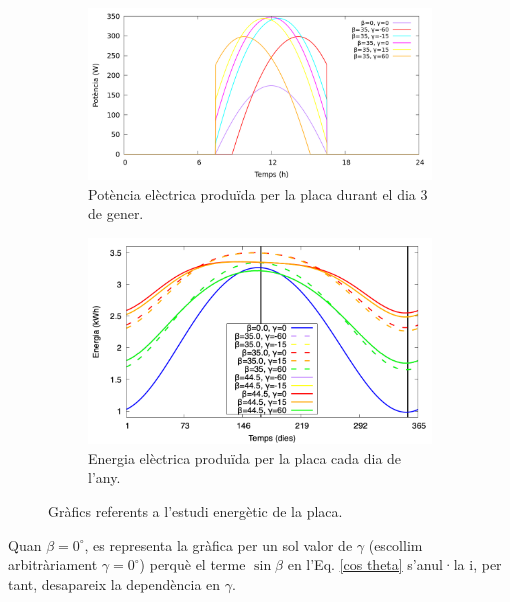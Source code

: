 \documentclass[11pt]{article}
\begin{document}
\begin{figure}[H]
    \centering
    \begin{subfigure}{0.5\textwidth}
        \centering
        \includegraphics[width=\textwidth]{dia_3gener_pot_plot.png}
        \caption{Potència elèctrica produïda per la placa durant el dia 3 de gener.}
        \label{fig: potencia}
    \end{subfigure}%
    \hspace{0.000001\textwidth}%
    \begin{subfigure}{0.5\textwidth}
        \centering
        \includegraphics[width=\textwidth]{energia.png}
        \caption{Energia elèctrica produïda per la placa cada dia de l'any.}
        \label{fig: energia}
    \end{subfigure}
    \caption{Gràfics referents a l'estudi energètic de la placa.}
    \label{estudi energia}
\end{figure}

Quan $\beta=0^{\circ}$, es representa la gràfica per un sol valor de $\gamma$ (escollim arbitràriament $\gamma=0^{\circ}$) perquè el terme $\sin\beta$ en l’Eq. \eqref{cos theta} s’anul·la i, per tant, desapareix la dependència en $\gamma$.
\end{document}
